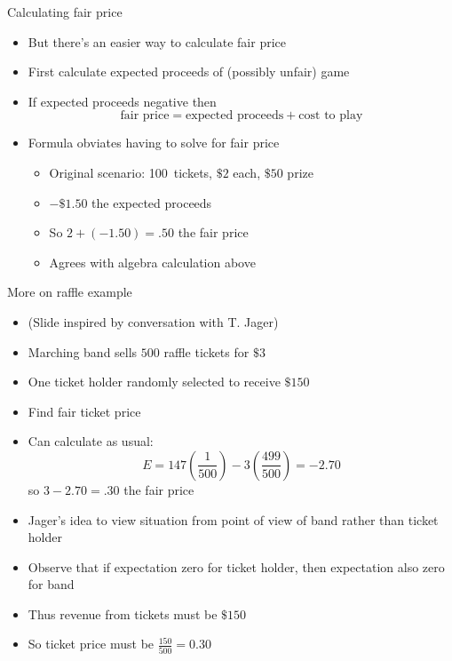 \documentclass[handout]{beamer}
\theoremstyle{definition}
\begin{document}
\begin{frame}{Calculating fair price}
\begin{itemize}
\item But there's an easier way to calculate fair price
\item First calculate expected proceeds of (possibly unfair) game
\item If expected proceeds \alert{negative} then
\[\text{fair price}=\text{expected proceeds}+\text{cost to play}\]
\item Formula obviates having to solve for fair price
\begin{example}
\begin{itemize}
\item Original scenario: 100~tickets, $\$2$ each, $\$50$ prize
\item $-\$1.50$ the expected proceeds
\item So $2+\left(-1.50\right)=.50$ the fair price
\item Agrees with algebra calculation above
\end{itemize}
\end{example}
\end{itemize}
\end{frame}

\begin{frame}{More on raffle example}
\begin{itemize}
\item (Slide inspired by conversation with T. Jager)
\item Marching band sells $500$ raffle tickets for $\$3$
\item One ticket holder randomly selected to receive $\$150$
\item Find fair ticket price
\item Can calculate as usual:
\[E=147\left(\frac{1}{500}\right)-3\left(\frac{499}{500}\right)=-2.70\]
so $3-2.70=.30$ the fair price
\item Jager's idea to view situation from point of view
of band rather than ticket holder
\item Observe that if expectation zero for ticket holder,
then expectation also zero for band
\item Thus revenue from tickets must be $\$150$
\item So ticket price must be $\frac{150}{500}=0.30$
\end{itemize}
\end{frame}
\end{document}
